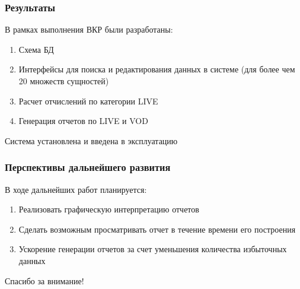 \documentclass{beamer}
\begin{document}
\begin{frame}
\frametitle{Результаты}
В рамках выполнения ВКР были разработаны:
\begin{enumerate}
\item {
Схема БД
}
\item {
Интерфейсы для поиска и редактирования данных в системе (для более чем 20 множеств сущностей)
}
\item {
Расчет отчислений по категории LIVE
}
\item {
Генерация отчетов по LIVE и VOD
}
\end{enumerate}


Система установлена и введена в эксплуатацию

\end{frame}

\begin{frame}
\frametitle{Перспективы дальнейшего развития}
В ходе дальнейших работ планируется:
\begin{enumerate}
\item {
Реализовать графическую интерпретацию отчетов
}
\item {
Сделать возможным просматривать отчет в течение времени его построения
}
\item {
Ускорение генерации отчетов за счет уменьшения количества избыточных данных
}
\end{enumerate}


\end{frame}


\begin{frame}
{\Large Спасибо за внимание!}
\end{frame}
\end{document}
